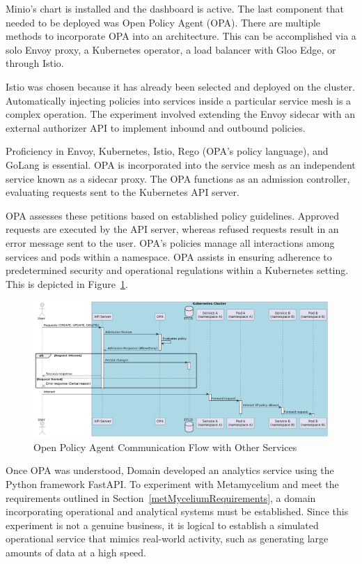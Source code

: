 \documentclass[preprint,12pt]{elsarticle}
\begin{document}
Minio's chart is installed and the dashboard is active. The last component that needed to be deployed was Open Policy Agent (OPA). There are multiple methods to incorporate OPA into an architecture. This can be accomplished via a solo Envoy proxy, a Kubernetes operator, a load balancer with Gloo Edge, or through Istio. 

Istio was chosen because it has already been selected and deployed on the cluster. Automatically injecting policies into services inside a particular service mesh is a complex operation. The experiment involved extending the Envoy sidecar with an external authorizer API to implement inbound and outbound policies. 

Proficiency in Envoy, Kubernetes, Istio, Rego (OPA's policy language), and GoLang is essential. OPA is incorporated into the service mesh as an independent service known as a sidecar proxy. The OPA functions as an admission controller, evaluating requests sent to the Kubernetes API server. 

OPA assesses these petitions based on established policy guidelines. Approved requests are executed by the API server, whereas refused requests result in an error message sent to the user. OPA's policies manage all interactions among services and pods within a namespace. OPA assists in ensuring adherence to predetermined security and operational regulations within a Kubernetes setting. This is depicted in Figure~\ref{OPAISTIO}.

\begin{figure}[h!]
  \centering
  \includegraphics[width=\textwidth]{images/OPA-istio-flow.png}
  \caption{Open Policy Agent Communication Flow with Other Services}
  \label{OPAISTIO}
\end{figure}

Once OPA was understood, Domain developed an analytics service using the Python framework FastAPI. To experiment with Metamycelium and meet the requirements outlined in Section~\ref{metMyceliumRequirements}, a domain incorporating operational and analytical systems must be established. Since this experiment is not a genuine business, it is logical to establish a simulated operational service that mimics real-world activity, such as generating large amounts of data at a high speed. 
\end{document}
